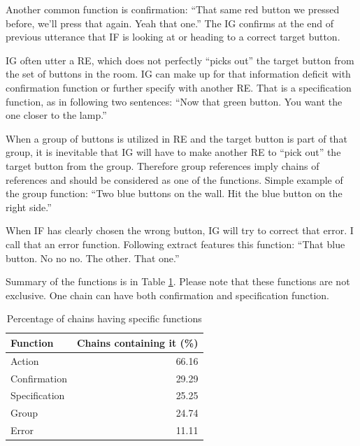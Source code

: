 Another common function is confirmation: ``That same red button we pressed before, we'll press that again. Yeah that one.'' The IG confirms at the end of previous utterance that IF is looking at or heading to a correct target button.

IG often utter a RE, which does not perfectly ``picks out'' the target button from the set of buttons in the room. IG can make up for that information deficit with confirmation function or further specify with another RE. That is a specification function, as in following two sentences: ``Now that green button. You want the one closer to the lamp.''

When a group of buttons is utilized in RE and the target button is part of that group, it is inevitable that IG will have to make another RE to ``pick out'' the target button from the group. Therefore group references imply chains of references and should be considered as one of the functions. Simple example of the group function: ``Two blue buttons on the wall. Hit the blue button on the right side.''

When IF has clearly chosen the wrong button, IG will try to correct that error. I call that an error function. Following extract features this function: ``That blue button. No no no. The other. That one.''

Summary of the functions is in Table \ref{tab:chains-functions}. Please note that these functions are not exclusive. One chain can have both confirmation and specification function.

\begin{table}[h!]
\centering
\begin{tabular}{lr}
\toprule
Function   & Chains containing it (\%)  \\
\midrule
Action    		& 66.16\\
Confirmation	 	& 29.29\\
Specification 	& 25.25\\
Group 	  		& 24.74\\
Error 			& 11.11\\
\bottomrule
\end{tabular}
\caption{Percentage of chains having specific functions}
\label{tab:chains-functions}
\end{table}



